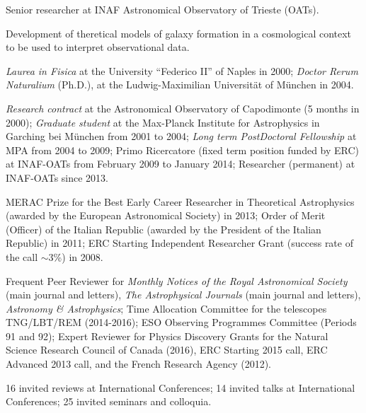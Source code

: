 \documentclass[fancyheadings,12pt,a4paper]{article}
\begin{document}
\begin{large}
\end{large}

\smallskip\smallskip{}
Senior researcher at INAF Astronomical Observatory of Trieste (OATs).

\smallskip\smallskip{}
Development of theretical models of galaxy formation in a cosmological context
to be used to interpret observational data. 

\smallskip\smallskip{} {\it Laurea
  in Fisica} at the University ``Federico II'' of Naples in 2000; {\it Doctor
  Rerum Naturalium} (Ph.D.), at the Ludwig-Maximilian Universit\"at of
M\"unchen in 2004.

\smallskip\smallskip{} {\it
  Research contract} at the Astronomical Observatory of Capodimonte (5 months
in 2000); {\it Graduate student} at the Max-Planck Institute for Astrophysics
in Garching bei M\"unchen from 2001 to 2004; {\it Long term PostDoctoral
  Fellowship} at MPA from 2004 to 2009; Primo Ricercatore (fixed term position
funded by ERC) at INAF-OATs from February 2009 to January 2014; Researcher
(permanent) at INAF-OATs since 2013.

\smallskip\smallskip{} MERAC Prize
for the Best Early Career Researcher in Theoretical Astrophysics (awarded by
the European Astronomical Society) in 2013; Order of Merit (Officer) of the
Italian Republic (awarded by the President of the Italian Republic) in 2011;
ERC Starting Independent Researcher Grant (success rate of the call $\sim 3$\%)
in 2008.

\smallskip\smallskip{} Frequent Peer Reviewer for {\it Monthly Notices of the
  Royal Astronomical Society} (main journal and letters), {\it The
  Astrophysical Journals} (main journal and letters), {\it Astronomy \&
  Astrophysics}; Time Allocation Committee for the telescopes TNG/LBT/REM
(2014-2016); ESO Observing Programmes Committee (Periods 91 and 92); Expert
Reviewer for Physics Discovery Grants for the Natural Science Research Council
of Canada (2016), ERC Starting 2015 call, ERC Advanced 2013 call, and the
French Research Agency (2012). 

\smallskip\smallskip{} 16 invited reviews at International Conferences; 14 invited
talks at International Conferences; 25 invited seminars and colloquia. 
\end{document}
